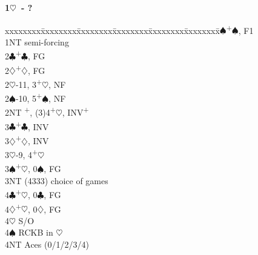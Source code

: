 \documentclass[10pt]{article}
\renewcommand{\c}{$\clubsuit$}
\renewcommand{\d}{$\diamondsuit$}
\newcommand{\h}{$\heartsuit$}
\newcommand{\s}{$\spadesuit$}
\newcommand{\p}{\textsuperscript{+}}
\newenvironment{bidtable}[1][]
{\textbf{#1}
  \begin{adjustwidth}{1em}{}
    \addvspace{2pt}
    \begin{tabbing}
      xxxxxxxx\=xxxxxxxx\=xxxxxxxx\=xxxxxxxx\=xxxxxxxx\=xxxxxxxx\=\kill}
{\end{tabbing}\end{adjustwidth}\bigskip}%
\begin{document}
\begin{multicols*}{2}
\begin{bidtable}[1\h\ - ?]
1\s {}\p\s, F1              \\
1NT \> semi-forcing           \\
2\c {}\p\c, FG              \\
2\d {}\p\d, FG              \\
2\h {}-11, 3\p\h, NF        \\
2\s {}-10, 5\p\s, NF        \\
2NT \p, (3)4\p\h, INV\p  \\
3\c {}\p\c, INV             \\
3\d {}\p\d, INV             \\
3\h {}-9, 4\p\h             \\
3\s {}\p\h, 0\s, FG         \\
3NT \> (4333) choice of games \\
4\c {}\p\h, 0\c, FG         \\
4\d {}\p\h, 0\d, FG         \\
4\h \> S/O                    \\
4\s \> RCKB in \h             \\
4NT \> Aces (0/1/2/3/4)       \\
\end{bidtable}


\end{multicols*}
\end{document}
